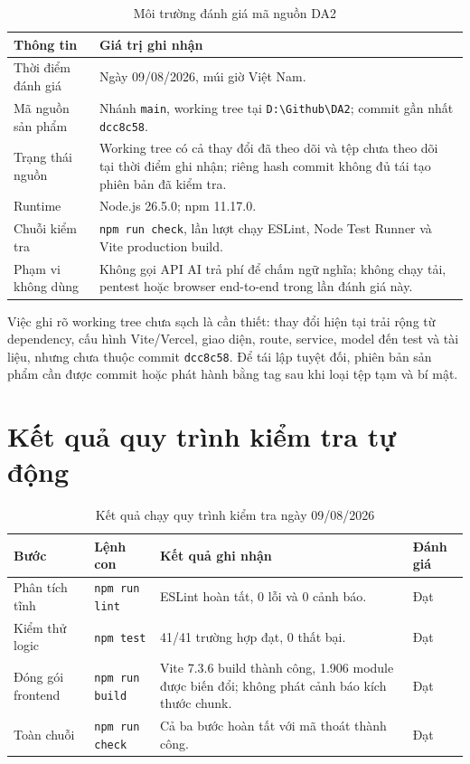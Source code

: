 \begin{table}[H]
    \centering
    \small
    \begin{tabularx}{\textwidth}{|p{}|Y|} \hline
        \textbf{Thông tin} & \textbf{Giá trị ghi nhận} \\ \hline
        Thời điểm đánh giá & Ngày 09/08/2026, múi giờ Việt Nam. \\ \hline
        Mã nguồn sản phẩm & Nhánh \texttt{main}, working tree tại \texttt{D:\textbackslash Github\textbackslash DA2}; commit gần nhất \texttt{dcc8c58}. \\ \hline
        Trạng thái nguồn & Working tree có cả thay đổi đã theo dõi và tệp chưa theo dõi tại thời điểm ghi nhận; riêng hash commit không đủ tái tạo phiên bản đã kiểm tra. \\ \hline
        Runtime & Node.js 26.5.0; npm 11.17.0. \\ \hline
        Chuỗi kiểm tra & \texttt{npm run check}, lần lượt chạy ESLint, Node Test Runner và Vite production build. \\ \hline
        Phạm vi không dùng & Không gọi API AI trả phí để chấm ngữ nghĩa; không chạy tải, pentest hoặc browser end-to-end trong lần đánh giá này. \\ \hline
    \end{tabularx}
    \caption{Môi trường đánh giá mã nguồn DA2}
    \label{tab:test-environment}
\end{table}

Việc ghi rõ working tree chưa sạch là cần thiết: thay đổi hiện tại trải rộng từ dependency, cấu hình Vite/Vercel, giao diện, route, service, model đến test và tài liệu, nhưng chưa thuộc commit \texttt{dcc8c58}. Để tái lập tuyệt đối, phiên bản sản phẩm cần được commit hoặc phát hành bằng tag sau khi loại tệp tạm và bí mật.

\section{Kết quả quy trình kiểm tra tự động}

\begin{table}[H]
    \centering
    \small
    \begin{tabularx}{\textwidth}{|p{}|p{}|Y|p{0.13\textwidth}|} \hline
        \textbf{Bước} & \textbf{Lệnh con} & \textbf{Kết quả ghi nhận} & \textbf{Đánh giá} \\ \hline
        Phân tích tĩnh & \texttt{npm run lint} & ESLint hoàn tất, 0 lỗi và 0 cảnh báo. & Đạt \\ \hline
        Kiểm thử logic & \texttt{npm test} & 41/41 trường hợp đạt, 0 thất bại. & Đạt \\ \hline
        Đóng gói frontend & \texttt{npm run build} & Vite 7.3.6 build thành công, 1.906 module được biến đổi; không phát cảnh báo kích thước chunk. & Đạt \\ \hline
        Toàn chuỗi & \texttt{npm run check} & Cả ba bước hoàn tất với mã thoát thành công. & Đạt \\ \hline
    \end{tabularx}
    \caption{Kết quả chạy quy trình kiểm tra ngày 09/08/2026}
    \label{tab:check-results}
\end{table}

